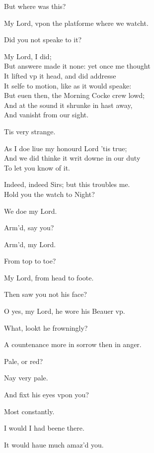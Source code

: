 \documentclass[a5paper,DIV=calc,11pt]{scrbook}
\begin{document}
\begin{drama*}
    \hamspeaks But where was this?
    
    \marspeaks My Lord, vpon the platforme where we watcht.
    
    \hamspeaks Did you not speake to it?
    
    \horspeaks My Lord, I did;\\
    But answere made it none: yet once me thought\\
    It lifted vp it head, and did addresse\\
    It selfe to motion, like as it would speake:\\
    But euen then, the Morning Cocke crew lowd;\\
    And at the sound it shrunke in hast away,\\
    And vanisht from our sight.
    
    \hamspeaks Tis very strange.
    
    \horspeaks As I doe liue my honourd Lord 'tis true;\\
    And we did thinke it writ downe in our duty\\
    To let you know of it.
    
    \hamspeaks Indeed, indeed Sirs; but this troubles me.\\
    Hold you the watch to Night?
    
     We doe my Lord.
    
    \hamspeaks Arm'd, say you?
    
     Arm'd, my Lord.
    
    \hamspeaks From top to toe?
    
     My Lord, from head to foote.
    
    \hamspeaks Then saw you not his face?
    
    \horspeaks O yes, my Lord, he wore his Beauer vp.
    
    \hamspeaks What, lookt he frowningly?
    
    \horspeaks A countenance more in sorrow then in anger.
    
    \hamspeaks Pale, or red?
    
    \horspeaks Nay very pale.
    
    \hamspeaks And fixt his eyes vpon you?
    
    \horspeaks Most constantly.
    
    \hamspeaks I would I had beene there.
    
    \horspeaks It would haue much amaz'd you.
    

\end{drama*}
\end{document}

